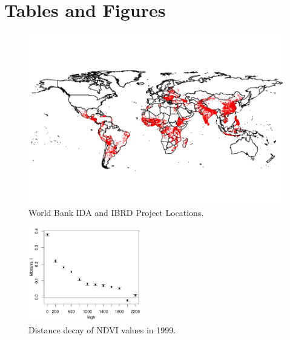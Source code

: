 \documentclass{article}\usepackage[]{graphicx}\usepackage[]{color}
\makeatletter
\def\maxwidth{ %
  \ifdim\Gin@nat@width>\linewidth
    \linewidth
  \else
    \Gin@nat@width
  \fi
}
\newenvironment{knitrout}{}{}  %
\makeatother
\begin{document}
\begin{knitrout}
\newpage
\section{Tables and Figures}

\begin{figure}[H]
\begin{Schunk}

\includegraphics[width=\maxwidth]{figure/WLocs-1} \end{Schunk}
\caption{World Bank IDA and IBRD Project Locations.}
\label{WBLocs}
\vspace{25pt}
\end{figure}  

\begin{figure}[H]
\centering
 \includegraphics[width=0.45\textwidth]{pre_avg_NDVI_max_full}
\caption{Distance decay of NDVI values in 1999.}
  \label{DDFig}
\end{figure}


\end{knitrout}
\end{document}
